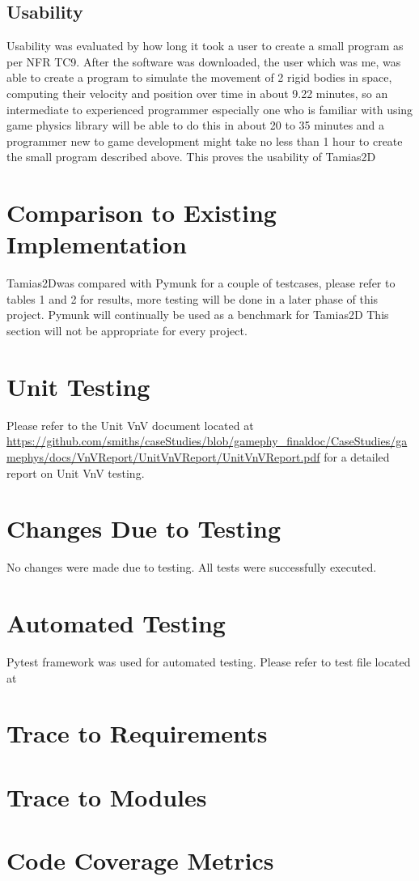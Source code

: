 \documentclass[12pt, titlepage]{article}
\newcommand{\progname}{Tamias2D}
\begin{document}
\subsection{Usability}
Usability was evaluated by how long it took a user to create a small program as per NFR TC9. After the software was downloaded, the user which was me, was able to create a program to simulate the movement of 2 rigid bodies in space, computing their velocity and position over time in about 9.22 minutes, so an intermediate to experienced programmer especially one who is familiar with using game physics library will be able to do this in about 20 to 35 minutes and a programmer new to game development might take no less than 1 hour to create the small program described above. This proves the usability of \progname{}
	
\section{Comparison to Existing Implementation}	
\progname was compared with Pymunk for a couple of testcases, please refer to tables 1 and 2 for results, more testing will be done in a later phase of this project. Pymunk will continually be used as a benchmark for \progname
This section will not be appropriate for every project.

\section{Unit Testing}
Please refer to the Unit VnV document located at \url{https://github.com/smiths/caseStudies/blob/gamephy_finaldoc/CaseStudies/gamephys/docs/VnVReport/UnitVnVReport/UnitVnVReport.pdf} for a detailed report on Unit VnV testing.

\section{Changes Due to Testing}
No changes were made due to testing. All tests were successfully executed.

\section{Automated Testing}
Pytest framework was used for automated testing. Please refer to test file located at 
		
\section{Trace to Requirements}
		
\section{Trace to Modules}		

\section{Code Coverage Metrics}




\end{document}
